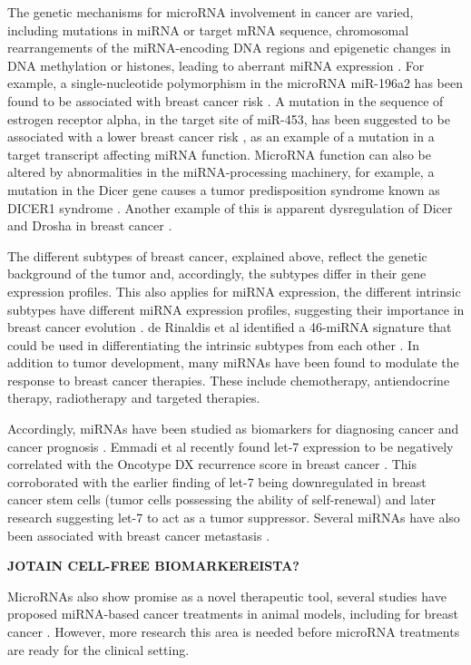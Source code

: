 The genetic mechanisms for microRNA involvement in cancer are varied,
including mutations in miRNA or target mRNA sequence, chromosomal
rearrangements of the miRNA-encoding DNA regions and epigenetic changes in DNA
methylation or histones, leading to aberrant miRNA expression
\citep{Calin2006,Melo2011}. For example, a single-nucleotide polymorphism
in the microRNA miR-196a2 has been found to be associated with breast cancer
risk \citep{Gao2011}. A mutation in the sequence of estrogen receptor alpha,
in the target site of miR-453, has been suggested to be associated with a
lower breast cancer risk \citep{Tchatchou2009}, as an example of a mutation in
a target transcript affecting miRNA function. MicroRNA function can also be
altered by abnormalities in the miRNA-processing machinery, for example, a
mutation in the Dicer gene causes a tumor predisposition syndrome known as
DICER1 syndrome \citep{Slade2011}. Another example of this is apparent
dysregulation of Dicer and Drosha in breast cancer
\citep{Yan2012}.

The different subtypes of breast cancer, explained above, reflect the genetic
background of the tumor and, accordingly, the subtypes differ in their gene
expression profiles. This also applies for miRNA expression, the different
intrinsic subtypes have different miRNA expression profiles, suggesting their
importance in breast cancer evolution \citep{Blenkiron2007}. de Rinaldis et al
identified a 46-miRNA signature that could be used in differentiating the
intrinsic subtypes from each other \citep{deRinaldis2013}. In addition to
tumor development, many miRNAs have been found to modulate the response to
breast cancer therapies. These include chemotherapy, antiendocrine therapy,
radiotherapy and targeted therapies.

Accordingly, miRNAs have been studied as biomarkers for diagnosing cancer and
cancer prognosis \citep{}. Emmadi et al recently found let-7 expression to be negatively
correlated with the Oncotype DX recurrence score in breast cancer
\citep{Emmadi2015}. This corroborated with the earlier finding of let-7 being
downregulated in breast cancer stem cells (tumor cells possessing the ability
of self-renewal) \citep{Yu2007} and later research suggesting let-7 to act as
a tumor suppressor. Several miRNAs have also been associated with breast cancer
metastasis \citep{Chen2016}.

\textbf{JOTAIN CELL-FREE BIOMARKEREISTA?}

MicroRNAs also show promise as a novel therapeutic tool, several studies have
proposed miRNA-based cancer treatments in animal models, including for breast
cancer \citep{VanRooij2014}. However, more research this area is needed before
microRNA treatments are ready for the clinical setting.

